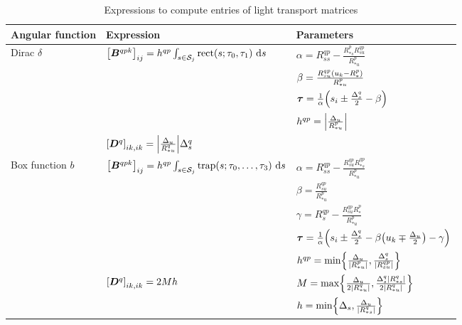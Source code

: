 \begin{table}
    \centering
    \begin{tabular}{lll}
        \toprule
        {\bf Angular function} & {\bf Expression} & {\bf Parameters} \\
        \midrule 
        Dirac $\delta$ 
        &
        $ {\left[ {\bm{B}}^{qpk} \right] }_{ij} = h^{qp} \int_{s \in \mathcal{S}_j} \text{rect} {\left( s; \tau_0, \tau_1 \right)} ~\text{d}{s}$
        &
        $\alpha = R^{qp}_{ss} - \frac{R^p_{*s} R^{qp}_{su}}{R^p_{*u}}$
        \\ & & 
        $\beta = \frac{R^{qp}_{su} {\left( u_k - R^p_* \right)}}{R^p_{*u}}$
        \\ & &
        ${\bm{\tau}} = \frac{1}{\alpha} {\left( s_i \pm \frac{\Delta_s^q}{2} - \beta \right)}$
        \\ & &
        $h^{qp} =  {\left| \frac{\Delta_u}{R^p_{*u}} \right| }$
        \\
        &
        $\GB{\bD^q}_{ik, ik} = \GM{%
            \frac{\Delta_u}{R^q_{*u}}
        }
        \Delta_s^q$
        \\
        \midrule
        Box function $b$
        &
        $ {\left[ {\bm{B}}^{qpk} \right] }_{ij} = h^{qp} \int_{s \in \mathcal{S}_j} \text{trap} {\left( s; \tau_0, \ldots, \tau_3 \right)} ~\text{d}{s}$
        &
        $\alpha = R^{qp}_{ss} - \frac{R^{qp}_{su} R^{qp}_{*s}}{R^p_{*u}}$ 
        \\ & &
        $\beta = \frac{R^{qp}_{su}}{R^p_{*u}}$
        \\ & &
        $\gamma = R^{qp}_s - \frac{R^{qp}_{su} R^p_*}{R^p_{*u}}$
        \\ & &
        ${\bm{\tau}} = \frac{1}{\alpha} {\left( s_i \pm \frac{\Delta_s^q}{2} - \beta {\left( u_k \mp \frac{\Delta_u}{2} \right)} - \gamma \right)}$
        \\ & &
        $h^{qp} = \text{min}\GC{%
            \frac{\Delta_u}{\GM{R^p_{*u}}},
            \frac{\Delta^q_s}{\GM{R^{qp}_{su}}}
        }$
        \\
        &
        $ {\left[ {\bm{D}}^q \right] }_{ik, ik} = 2 M h$
        &
        $M = \text{max}\GC{%
            \frac{\Delta_u}{2 \GM{R^q_{*u}}},
            \frac{\Delta_s^q \GM{R^q_{*s}}}{2 \GM{R^q_{*u}}}
        }$
        \\ & &
        $h = \text{min}\GC{%
            \Delta_s, 
            \frac{\Delta_u}{\GM{R^q_{*s}}}
        }$
        \\ \bottomrule 
    \end{tabular}
    \caption{Expressions to compute entries of light transport matrices}
    \label{tab,xport}
\end{table}
